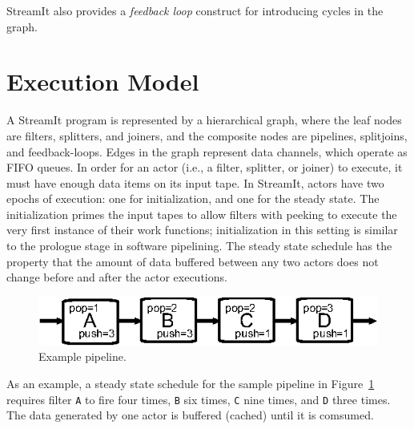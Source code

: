 StreamIt also provides a {\it feedback loop} construct for introducing
cycles in the graph.

\section{Execution Model}
\label{sec:execmodel}

A StreamIt program is represented by a hierarchical graph,
where the leaf nodes are filters, splitters, and joiners, and
the composite nodes are pipelines, splitjoins, and
feedback-loops. Edges in the graph represent data channels, which 
operate as FIFO queues.
In order for an actor  (i.e., a filter,
splitter, or joiner) to execute, it must have enough data items on its input
tape. In StreamIt, actors have  two epochs
of execution: one for initialization, and one for the steady
state. The initialization primes the input tapes to allow filters with
peeking to execute the very first instance of their work functions;
initialization in this setting is similar to the prologue stage in
software pipelining. The steady state schedule has the property that
the amount of data buffered between any two actors does not change
before and after the actor executions.

\begin{figure}[t]
\begin{center}
 \includegraphics[scale=1, angle=0]{./pipe-with-rates.eps}
 \caption{Example pipeline.}
 \label{fig:pipe-with-rates}
\end{center}
\end{figure}

As an example, a steady state schedule for the sample pipeline in
Figure~\ref{fig:pipe-with-rates} requires filter \texttt{A} to fire
four times, \texttt{B} six times, \texttt{C} nine times, and
\texttt{D} three times. 
The data generated by one actor is buffered (cached) until it is
comsumed.

